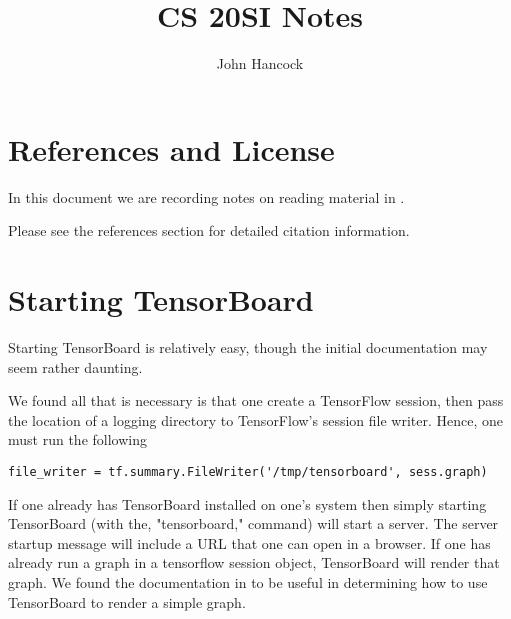\documentclass[a5paper,11pt]{article}
\author{John Hancock}
\title{CS 20SI Notes}
\begin{document}
\maketitle

\tableofcontents

\section{References and License}

In this document we are recording notes on reading material in
\cite{cs20siIntroSlides}.

Please see the references section for detailed citation information.


\section{Starting TensorBoard}

Starting TensorBoard is relatively easy, though the initial documentation
may seem rather daunting.

We found all that is necessary is that one create a TensorFlow session,
then pass the location of a logging directory to TensorFlow's session
file writer.  Hence, one must run the following
\begin{lstlisting}
file_writer = tf.summary.FileWriter('/tmp/tensorboard', sess.graph)
\end{lstlisting}
If one already has TensorBoard installed on one's system then simply 
starting TensorBoard (with the, "tensorboard," command) will start a server.
The server startup message will include a URL that one can open in a browser.
If one has already run a graph in a tensorflow session object, TensorBoard
will render that graph.
We found the documentation in \cite{tensorBoardIntro} to be useful in
determining how to use TensorBoard to render a simple graph.
\printbibliography{}
\end{document}
